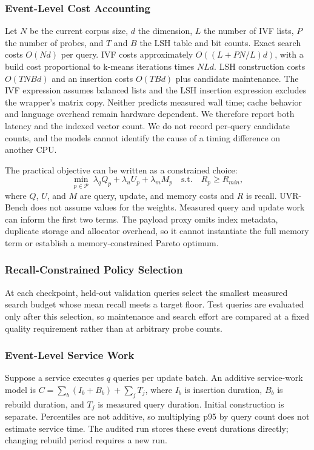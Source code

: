 \subsubsection{Event-Level Cost Accounting}
Let $N$ be the current corpus size, $d$ the dimension, $L$ the number of IVF lists,
$P$ the number of probes, and $T$ and $B$ the LSH table and bit counts. Exact search
costs $O(Nd)$ per query. IVF costs approximately $O((L+PN/L)d)$, with a build cost
proportional to k-means iterations times $NLd$. LSH construction costs $O(TNBd)$ and
an insertion costs $O(TBd)$ plus candidate maintenance. The IVF expression assumes balanced lists and the LSH insertion expression excludes
the wrapper's matrix copy. Neither predicts measured wall time; cache behavior and
language overhead remain hardware dependent. We therefore report both latency and the
indexed vector count. We do not record per-query candidate counts, and the models
cannot identify the cause of a timing difference on another CPU.

The practical objective can be written as a constrained choice:
\begin{equation}
\min_{p\in\mathcal P} \; \lambda_q Q_p+\lambda_u U_p+\lambda_m M_p
\quad\text{s.t.}\quad R_p\geq R_{min},
\end{equation}
where $Q$, $U$, and $M$ are query, update, and memory costs and $R$ is recall. UVR-Bench
does not assume values for the weights. Measured query and update work can inform
the first two terms. The payload proxy omits index metadata, duplicate storage and
allocator overhead, so it cannot instantiate the full memory term or establish a
memory-constrained Pareto optimum.

\subsubsection{Recall-Constrained Policy Selection}
At each checkpoint, held-out validation queries select the smallest measured search
budget whose mean recall meets a target floor. Test queries are evaluated only after
this selection, so maintenance and search effort are compared at a fixed quality
requirement rather than at arbitrary probe counts.

\subsubsection{Event-Level Service Work}
Suppose a service executes $q$ queries per update batch.
An additive service-work model is $C=\sum_b(I_b+B_b)+\sum_jT_j$, where $I_b$ is
insertion duration, $B_b$ is rebuild duration, and $T_j$ is measured query duration.
Initial construction is separate. Percentiles are not additive, so multiplying p95 by
query count does not estimate service time. The audited run stores these event durations
directly; changing rebuild period requires a new run.

